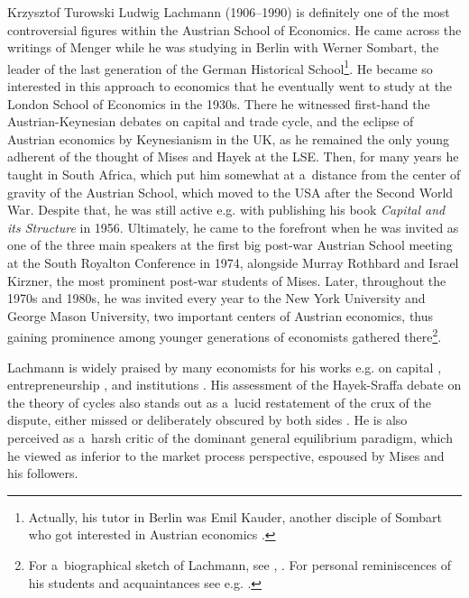 \begin{artengenv}{Krzysztof Turowski}
\lettrine[loversize=0.13,lines=2,lraise=-0.03,nindent=0em,findent=0.2pt]%
{L}{}udwig Lachmann (1906--1990) is definitely one of the most controversial figures within the Austrian School of Economics.
He came across the writings of Menger while he was studying in Berlin with Werner Sombart, the leader of the last generation of the German Historical School\footnote{Actually, his tutor in Berlin was Emil Kauder, another disciple of Sombart who got interested in Austrian economics \parencite[111]{wasserman-kauder}.}.
He became so interested in this approach to economics that he eventually went to study at the London School of Economics in the 1930s.
There he witnessed first-hand the Austrian-Keynesian debates on capital and trade cycle, and the eclipse of Austrian economics by Keynesianism in the UK, as he remained the only young adherent of the thought of Mises and Hayek at the LSE.
Then, for many years he taught in South Africa, which put him somewhat at a~distance from the center of gravity of the Austrian School, which moved to the USA after the Second World War. Despite that, he was still active e.g. with publishing his book \emph{Capital and its Structure} in 1956.
Ultimately, he came to the forefront when he was invited as one of the three main speakers at the first big post-war Austrian School meeting at the South Royalton Conference in 1974, alongside Murray Rothbard and Israel Kirzner, the most prominent post-war students of Mises.
Later, throughout the 1970s and 1980s, he was invited every year to the New York University and George Mason University, two important centers of Austrian economics, thus gaining prominence among younger generations of economists gathered there\footnote{For a~biographical sketch of Lachmann, see \textcite{mittenmaier}, \textcite{lewin-life}. For personal reminiscences of his students and acquaintances see e.g. \textcite{reminiscences,caldwell,boehm,boehm2000professor}.}.

Lachmann is widely praised by many economists for his works e.g. on capital \parencite{rothbard-present,lewin-life}, entrepreneurship \parencite{endres2013wresting,horwitz-entrepreneurship}, and institutions \parencite{foss2007institutions}. His assessment of the Hayek-Sraffa debate on the theory of cycles also stands out as a~lucid restatement of the crux of the dispute, either missed or deliberately obscured by both sides \parencite{gordon-other}.
He is also perceived as a~harsh critic of the dominant general equilibrium paradigm, which he viewed as inferior to the market process perspective, espoused by Mises and his followers.


\end{artengenv}
